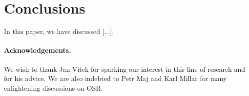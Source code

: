\section{Conclusions}
\label{se:conclusions}

In this paper, we have discussed [...].

\paragraph{Acknowledgements.}

We wish to thank Jan Vitek for sparking our interest in this line of research and for his advice. We are also indebted to Petr Maj and Karl Millar for many enlightening discussions on OSR.

  
  
  